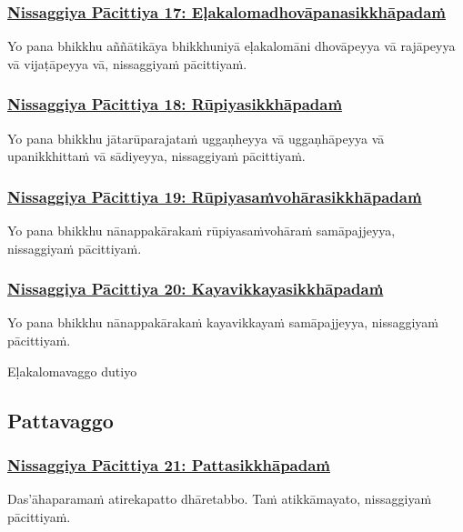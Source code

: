 \subsubsection*{\hyperref[forf-exp17]{Nissaggiya Pācittiya 17: Eḷakalomadhovāpanasikkhāpadaṁ}}
\label{np17}
Yo pana bhikkhu aññātikāya bhikkhuniyā eḷakalomāni dhovāpeyya vā rajāpeyya vā vijaṭāpeyya vā, nissaggiyaṁ pācittiyaṁ.

\subsubsection*{\hyperref[forf-exp18]{Nissaggiya Pācittiya 18: Rūpiyasikkhāpadaṁ}}
\label{np18}
Yo pana bhikkhu jātarūparajataṁ uggaṇheyya vā uggaṇhāpeyya vā upanikkhittaṁ vā sādiyeyya, nissaggiyaṁ pācittiyaṁ.

\subsubsection*{\hyperref[forf-exp19]{Nissaggiya Pācittiya 19: Rūpiyasaṁvohārasikkhāpadaṁ}}
\label{np19}
Yo pana bhikkhu nānappakārakaṁ rūpiyasaṁvohāraṁ samāpajjeyya, nissaggiyaṁ pācittiyaṁ.

\subsubsection*{\hyperref[forf-exp20]{Nissaggiya Pācittiya 20: Kayavikkayasikkhāpadaṁ}}
\label{np20}
Yo pana bhikkhu nānappakārakaṁ kayavikkayaṁ samāpajjeyya, nissaggiyaṁ pācittiyaṁ.

\begin{center}
  Eḷakalomavaggo dutiyo
\end{center}

\subsection{Pattavaggo}
\vspace{0.2cm}

\subsubsection*{\hyperref[forf-exp21]{Nissaggiya Pācittiya 21: Pattasikkhāpadaṁ}}
\label{np21}
Das'āhaparamaṁ atirekapatto dhāretabbo. Taṁ atikkāmayato, nissaggiyaṁ pācittiyaṁ.

